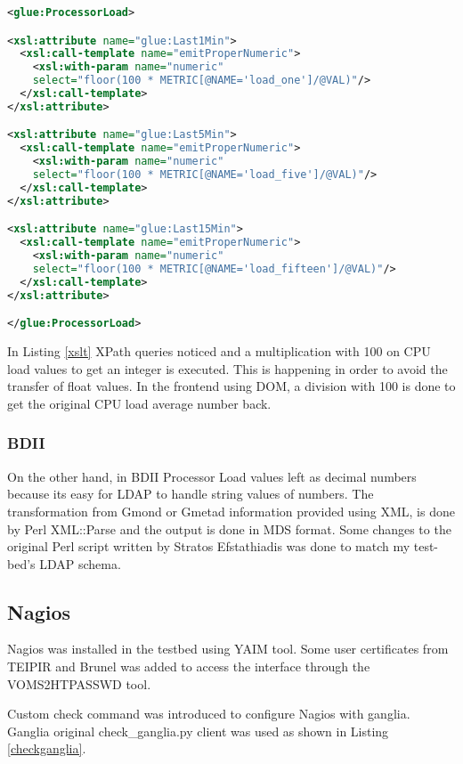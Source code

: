 \begin{lstlisting}[language=XML,caption=WSRF XSLT for Ganglia Information Provider,label=xslt]
<glue:ProcessorLoad>

<xsl:attribute name="glue:Last1Min">
  <xsl:call-template name="emitProperNumeric">
    <xsl:with-param name="numeric" 
    select="floor(100 * METRIC[@NAME='load_one']/@VAL)"/>
  </xsl:call-template>
</xsl:attribute>

<xsl:attribute name="glue:Last5Min">
  <xsl:call-template name="emitProperNumeric">
    <xsl:with-param name="numeric" 
    select="floor(100 * METRIC[@NAME='load_five']/@VAL)"/>
  </xsl:call-template>
</xsl:attribute>

<xsl:attribute name="glue:Last15Min">
  <xsl:call-template name="emitProperNumeric">
    <xsl:with-param name="numeric" 
    select="floor(100 * METRIC[@NAME='load_fifteen']/@VAL)"/>
  </xsl:call-template>
</xsl:attribute>

</glue:ProcessorLoad>
\end{lstlisting}

In Listing \ref{xslt} XPath queries noticed and a multiplication with 100 on CPU load values to get an integer is executed. This is happening in order to avoid the transfer of float values. In the frontend using DOM, a division with 100 is done to get the original CPU load average number back.

\subsubsection{BDII}

On the other hand, in BDII Processor Load values left as decimal numbers because its easy for LDAP to handle string values of numbers. The transformation from Gmond or Gmetad information provided using XML, is done by Perl XML::Parse and the output is done in MDS format. Some changes to the original Perl script written by Stratos Efstathiadis was done to match my test-bed's LDAP schema.

\subsection{Nagios}

Nagios was installed in the testbed using YAIM tool. Some user certificates from TEIPIR and Brunel was added to access the interface through the VOMS2HTPASSWD tool.

Custom check command was introduced to configure Nagios with ganglia. Ganglia original check\_ganglia.py client was used as shown in Listing \ref{checkganglia}.

